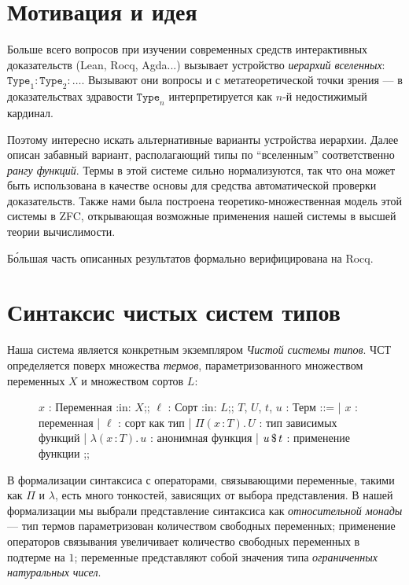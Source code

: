 \section{Мотивация и идея}

Больше всего вопросов при изучении современных средств
интерактивных доказательств (Lean, Rocq, Agda...)
вызывает устройство \textit{иерархий вселенных}:
$\mathtt{Type}_1 : \mathtt{Type}_2 : \ldots$.
Вызывают они вопросы и с метатеоретической точки зрения
--- в доказательствах здравости $\mathtt{Type}_n$
интерпретируется как $n$-й недостижимый кардинал.

Поэтому интересно искать альтернативные варианты
устройства иерархии. Далее описан забавный вариант,
располагающий типы по ``вселенным'' соответственно
\textit{рангу функций}. Термы в этой системе сильно
нормализуются, так что она может быть использована в
качестве основы для средства автоматической проверки
доказательств. Также нами была построена
теоретико-множественная модель этой системы в ZFC,
открывающая возможные применения нашей системы в высшей
теории вычислимости.

Б\'{о}льшая часть описанных результатов формально
верифицирована на Rocq.

\section{Синтаксис чистых систем типов}

Наша система является конкретным экземпляром
\textit{Чистой системы типов}. ЧСТ определяется поверх
множества \textit{термов}, параметризованного
множеством переменных $X$ и множеством сортов $L$:

\begin{figure}[h]
\begin{bnf}
$x$ : \textsf{Переменная} :in: $X$;;
$\ell$ : \textsf{Сорт} :in: $L$;;
$T$, $U$, $t$, $u$ : \textsf{Терм} ::=
| $x$ : переменная
| $\ell$ : сорт как тип
| $\Pi(x\,\colon T).\,U$ : тип зависимых функций
| $\lambda(x\,\colon T).\,u$ : анонимная функция
| $u\,\$\,t$ : применение функции
;;
\end{bnf}
\end{figure}

В формализации синтаксиса с операторами, связывающими
переменные, такими как $\Pi$ и $\lambda$, есть много
тонкостей, зависящих от выбора представления. В нашей
формализации мы выбрали представление синтаксиса как
\textit{относительной монады} --- тип термов
параметризован количеством свободных переменных;
применение операторов связывания увеличивает количество
свободных переменных в подтерме на $1$; переменные
представляют собой значения типа \textit{ограниченных
натуральных чисел}.

